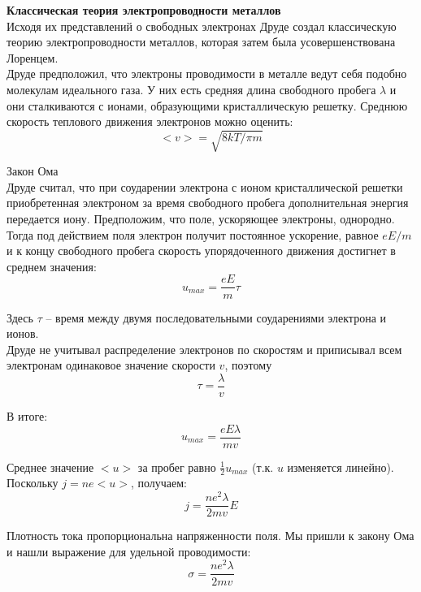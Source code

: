 \documentclass{article}
\begin{document}
	
	\textbf{Классическая теория электропроводности металлов}\\

	Исходя их представлений о свободных электронах Друде создал классическую теорию электропроводности металлов, которая затем была усовершенствована Лоренцем.\\

	Друде предположил, что электроны проводимости в металле ведут себя подобно молекулам идеального газа. У них есть средняя длина свободного пробега $\lambda$ и они сталкиваются с ионами, образующими кристаллическую решетку. Среднюю скорость теплового движения электронов можно оценить:
	\begin{equation}
		<v>=\sqrt{8kT/\pi m}
	\end{equation}

	Закон Ома\\

	Друде считал, что при соударении электрона с ионом кристаллической решетки приобретенная электроном за время свободного пробега дополнительная энергия передается иону. Предположим, что поле, ускоряющее электроны, однородно. Тогда под действием поля электрон получит постоянное ускорение, равное $eE/m$ и к концу свободного пробега скорость упорядоченного движения достигнет в среднем значения:
	\begin{equation}
		u_{max} = \frac{eE}{m}\tau
	\end{equation}

	Здесь $\tau$ -- время между двумя последовательными соударениями электрона и ионов.\\

	Друде не учитывал распределение электронов по скоростям и приписывал всем электронам одинаковое значение скорости $v$, поэтому
	\begin{equation}
		\tau = \frac{\lambda}{v}
	\end{equation}

	В итоге:
	\begin{equation}
		u_{max} = \frac{eE\lambda}{mv}
	\end{equation}

	Среднее значение $<u>$ за пробег равно $\frac{1}{2}u_{max}$ (т.к. $u$ изменяется линейно).\\

	Поскольку $j = ne<u>$, получаем:
	\begin{equation}
		j = \frac{ne^2\lambda}{2mv}E
	\end{equation}

	Плотность тока пропорциональна напряженности поля. Мы пришли к закону Ома и нашли выражение для удельной проводимости:
	\begin{equation}
		\sigma = \frac{ne^2\lambda}{2mv}
	\end{equation}
\end{document}
